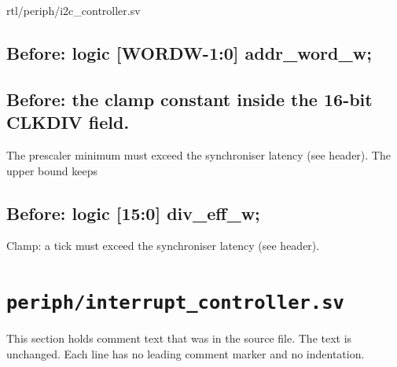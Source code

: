 \begin{relocated}{rtl/periph/i2c_controller.sv}
\subsection*{Before: logic [WORDW-1:0] addr\_word\_w;}


\subsection*{Before: the clamp constant inside the 16-bit CLKDIV field.}

\begin{textblock}
The prescaler minimum must exceed the synchroniser latency (see header). The upper bound keeps
\end{textblock}

\subsection*{Before: logic [15:0] div\_eff\_w;}

\begin{textblock}
Clamp: a tick must exceed the synchroniser latency (see header).
\end{textblock}

\end{relocated}

\section{\texttt{periph/interrupt\_controller.sv}}\label{tm:mod:interrupt-controller}

This section holds comment text that was in the source file. The text is unchanged. Each line has no leading comment marker and no indentation.

